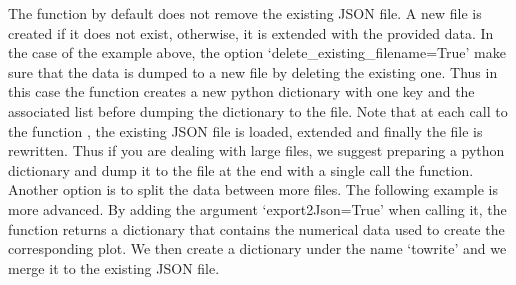 \documentclass[letterpaper,10pt,english]{sphinxmanual}
\begin{document}
\begin{sphinxVerbatim}[commandchars=\\\{\}]
       
     \PYG{p}{[} \PYG{p}{]}
   
   
\end{sphinxVerbatim}

\sphinxAtStartPar
The function  by default does not remove the existing JSON file. A new file is created if it does not exist, otherwise, it is extended with the provided data. In the case of the example above, the option ‘delete\_existing\_filename=True’ make sure that the data is dumped to a new file by deleting the existing one. Thus in this case the function creates a new python dictionary with one key and the associated list before dumping the dictionary to the file.
Note that at each call to the function , the existing JSON file is loaded, extended and finally the file is rewritten. Thus if you are dealing with large files, we suggest preparing a python dictionary and dump it to the file at the end with a single call the function. Another option is to split the data between more files.
The following example is more advanced. By adding the argument ‘export2Json=True’ when calling it, the function  returns a dictionary that contains the numerical data used to create the corresponding plot. We then create a dictionary under the name ‘towrite’ and we merge it to the existing JSON file.
\end{document}
